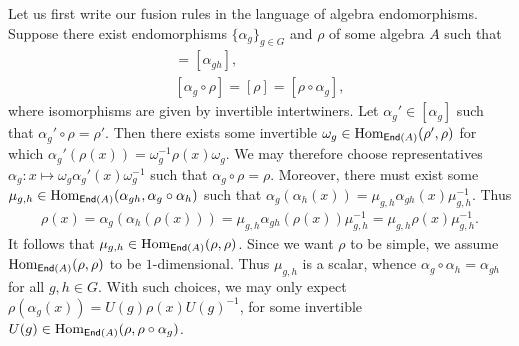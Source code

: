 

\noindent Let us first write our fusion rules in the language of algebra endomorphisms. Suppose there exist endomorphisms $\{\alpha_g\}_{g \in G}$ and $\rho$ of some algebra $A$ such that
\begin{gather*}
[\alpha_g \circ \alpha_h] = [\alpha_{gh}],\\
[\alpha_g \circ \rho] = [\rho] = [\rho \circ \alpha_g],
\end{gather*}
\noindent where isomorphisms are given by invertible intertwiners. Let $\alpha_g' \in [\alpha_g]$ such that $\alpha_g' \circ \rho = \rho'$. Then there exists some invertible $\omega_g \in \textup{Hom}_{\textup{\textsf{End}}(A)}(\rho', \rho)$ for which $\alpha_g'(\rho(x)) = \omega_g^{-1}\rho(x)\omega_g$. We may therefore choose representatives $\alpha_g : x \mapsto \omega_g\alpha_g'(x)\omega_g^{-1}$ such that $\alpha_g \circ \rho = \rho$. Moreover, there must exist some $\mu_{g,h} \in \textup{Hom}_{\textup{\textsf{End}}(A)}(\alpha_{gh}, \alpha_g \circ \alpha_h)$ such that $\alpha_g(\alpha_h(x)) = \mu_{g,h}\alpha_{gh}(x)\mu_{g,h}^{-1}$. Thus
\begin{align*}
\rho(x) = \alpha_g(\alpha_h(\rho(x))) = \mu_{g,h}\alpha_{gh}(\rho(x))\mu_{g,h}^{-1} = \mu_{g,h}\rho(x)\mu_{g,h}^{-1}.
\end{align*}
\noindent It follows that $\mu_{g,h} \in \textup{Hom}_{\textup{\textsf{End}}(A)}(\rho, \rho)$. Since we want $\rho$ to be simple, we assume $\textup{Hom}_{\textup{\textsf{End}}(A)}(\rho, \rho)$ to be $1$-dimensional. Thus $\mu_{g,h}$ is a scalar, whence $\alpha_g \circ \alpha_h = \alpha_{gh}$ for all $g, h \in G$. With such choices, we may only expect $\rho(\alpha_g(x)) = U(g)\rho(x)U(g)^{-1}$, for some invertible $U(g) \in \textup{Hom}_{\textup{\textsf{End}}(A)}(\rho, \rho \circ \alpha_g)$.\\

